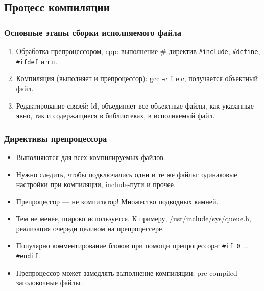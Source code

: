 \documentclass[hyperref={unicode=true}]{beamer}
\begin{document}
\subsection{Процесс компиляции}

\begin{frame}
\frametitle{Основные этапы сборки исполняемого файла}
\begin{enumerate}
\item Обработка препроцессором, cpp: выполнение \#-директив
  \texttt{\#include}, \texttt{\#define}, \texttt{\#ifdef} и т.п.
\item Компиляция (выполняет и препроцессор): gcc -c file.c, получается
  объектный файл. 
\item Редактирование связей: ld, объединяет все объектные
  файлы, как указанные явно, так и содержащиеся в библиотеках, в
  исполняемый файл. 
\end{enumerate}
\end{frame}

\begin{frame}
\frametitle{Директивы препроцессора}
\begin{itemize}
\item Выполняются для всех компилируемых файлов. 
\item Нужно следить, чтобы подключались одни и те же файлы: одинаковые
  настройки при компиляции, include-пути и прочее.
\item Препроцессор --- не компилятор! Множество подводных камней. 
\item Тем не менее, широко используется. К примеру,
  /usr/include/sys/queue.h, реализация очереди целиком на
  препроцессере. 
\item Популярно комментирование блоков при помощи препроцессора:
  \texttt{\#if 0}  ... \texttt{\#endif}.
\item Препроцессор может замедлять выполнение компиляции: pre-compiled
  заголовочные файлы.
\end{itemize}
\end{frame}

\end{document}
